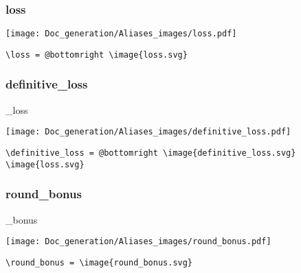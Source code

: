 \documentclass{article}
\begin{document}
\subsubsection{loss}
\begin{minipage}{0.45\linewidth}
\raggedright
\begin{spverbatim}
\loss 
\end{spverbatim}
\end{minipage}
\begin{minipage}{0.45\linewidth}
\raggedleft
\texttt{[image: Doc\_generation/Aliases\_images/loss.pdf]}
\end{minipage}
\begin{center}
\begin{BVerbatim}
\loss = @bottomright \image{loss.svg}
\end{BVerbatim}
\end{center}

\subsubsection{definitive\_loss}
\begin{minipage}{0.45\linewidth}
\raggedright
\begin{spverbatim}
_loss 
\end{spverbatim}
\end{minipage}
\begin{minipage}{0.45\linewidth}
\raggedleft
\texttt{[image: Doc\_generation/Aliases\_images/definitive\_loss.pdf]}
\end{minipage}
\begin{center}
\begin{BVerbatim}
\definitive_loss = @bottomright \image{definitive_loss.svg} \image{loss.svg}
\end{BVerbatim}
\end{center}

\subsubsection{round\_bonus}
\begin{minipage}{0.45\linewidth}
\raggedright
\begin{spverbatim}
\round_bonus 
\end{spverbatim}
\end{minipage}
\begin{minipage}{0.45\linewidth}
\raggedleft
\texttt{[image: Doc\_generation/Aliases\_images/round\_bonus.pdf]}
\end{minipage}
\begin{center}
\begin{BVerbatim}
\round_bonus = \image{round_bonus.svg}
\end{BVerbatim}
\end{center}
\end{document}
